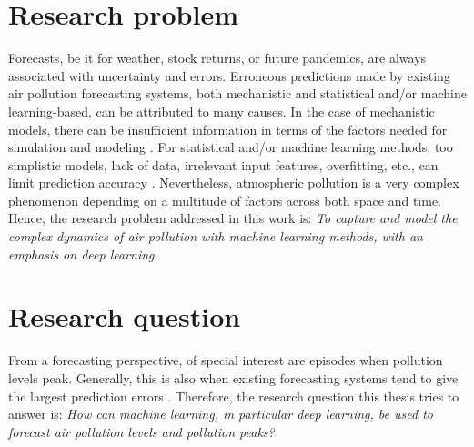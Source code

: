 
\section{Research problem}

Forecasts, be it for weather, stock returns, or future pandemics, are always associated with uncertainty and errors. Erroneous predictions made by existing air pollution forecasting systems, both mechanistic and statistical and/or machine learning-based, can be attributed to many causes. 
In the case of mechanistic models, there can be insufficient information in terms of the factors needed for simulation and modeling \cite{atmos7020015}. For statistical and/or machine learning methods, too simplistic models, lack of data, irrelevant input features, overfitting, etc., can limit prediction accuracy \cite{atmos7020015}. Nevertheless, atmospheric pollution is a very complex phenomenon depending on a multitude of factors across both space and time. Hence, the research problem addressed in this work is:
\textit{To capture and model the complex dynamics of air pollution with machine learning methods, with an emphasis on deep learning.}




\section{Research question}
From a forecasting perspective, of special interest are episodes when pollution levels peak. Generally, this is also when existing forecasting systems tend to give the largest prediction errors \cite{atmos7020015}. Therefore, the research question this thesis tries to answer is:
\textit{How can machine learning, in particular deep learning, be used to forecast air pollution levels and pollution peaks?}


